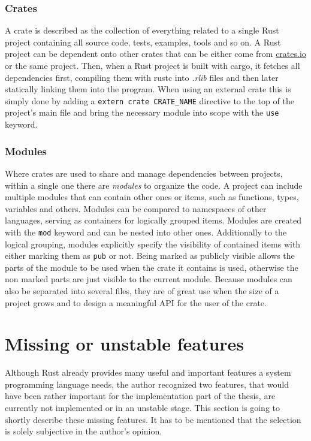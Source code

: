 \subsubsection{Crates}

A crate is described as the collection of everything related to a single Rust project containing all source code, tests, examples, tools and so on. A Rust project can be dependent onto other crates that can be either come from \url{crates.io} or the same project. Then, when a Rust project is built with cargo, it fetches all dependencies first, compiling them with rustc into \textit{.rlib} files and then later statically linking them into the program. When using an external crate this is simply done by adding a \texttt{extern crate CRATE\_NAME} directive to the top of the project's main file and bring the necessary module into scope with the \texttt{use} keyword.

\subsubsection{Modules}

Where crates are used to share and manage dependencies between projects, within a single one there are \textit{modules} to organize the code. A project can include multiple modules that can contain other ones or items, such as functions, types, variables and others. Modules can be compared to namespaces of other languages, serving as containers for logically grouped items. Modules are created with the \texttt{mod} keyword and can be nested into other ones. Additionally to the logical grouping, modules explicitly specify the visibility of contained items with either marking them as \texttt{pub} or not. Being marked as publicly visible allows the parts of the module to be used when the crate it contains is used, otherwise the non marked parts are just visible to the current module. Because modules can also be separated into several files, they are of great use when the size of a project grows and to design a meaningful \ac{API} for the user of the crate.

\section{Missing or unstable features}

Although Rust already provides many useful and important features a system programming language needs, the author recognized two features, that would have been rather important for the implementation part of the thesis, are currently not implemented or in an unstable stage. This section is going to shortly describe these missing features. It has to be mentioned that the selection is solely subjective in the author's opinion.

